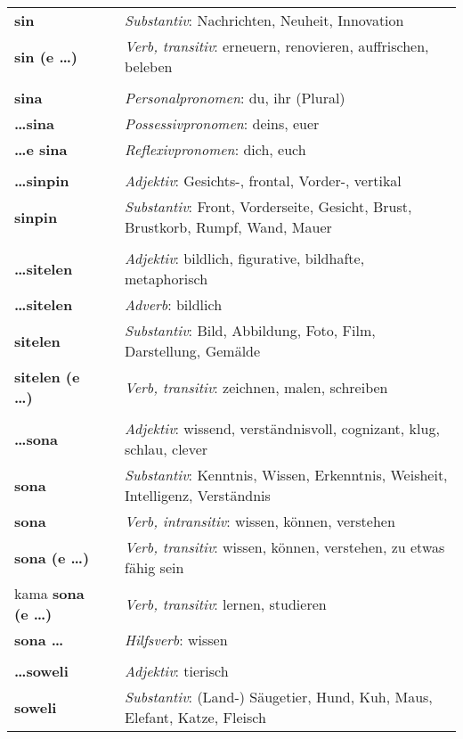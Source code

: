 \begin{supertabular}{p{2,5cm}|ll}
\textbf{sin} && \textit{Substantiv}: Nachrichten, Neuheit, Innovation \\ 
\textbf{sin (e \dots)} && \textit{Verb, transitiv}: erneuern, renovieren, auffrischen, beleben \\ 
 && \\ %
\textbf{sina} && \textit{Personalpronomen}: du, ihr (Plural)  \\ 
\textbf{\dots sina} && \textit{Possessivpronomen}: deins, euer  \\  
\textbf{\dots e sina} && \textit{Reflexivpronomen}: dich, euch  \\  
 && \\ %
\textbf{\dots sinpin} && \textit{Adjektiv}: Gesichts-, frontal, Vorder-, vertikal \\ 
\textbf{sinpin} && \textit{Substantiv}: Front, Vorderseite, Gesicht, Brust, Brustkorb, Rumpf, Wand, Mauer \\ 
 && \\ %
\textbf{\dots sitelen} && \textit{Adjektiv}: bildlich, figurative, bildhafte, metaphorisch \\ 
\textbf{\dots sitelen} && \textit{Adverb}: bildlich \\ 
\textbf{sitelen} && \textit{Substantiv}: Bild, Abbildung, Foto, Film, Darstellung, Gemälde \\ 
\textbf{sitelen (e \dots)} && \textit{Verb, transitiv}: zeichnen, malen, schreiben \\ 
 && \\ %
\textbf{\dots sona} && \textit{Adjektiv}: wissend, verständnisvoll, cognizant, klug, schlau, clever \\ 
\textbf{sona} && \textit{Substantiv}: Kenntnis, Wissen, Erkenntnis, Weisheit, Intelligenz, Verständnis \\ 
\textbf{sona} && \textit{Verb, intransitiv}: wissen, können, verstehen \\ 
\textbf{sona (e \dots)} && \textit{Verb, transitiv}: wissen, können, verstehen, zu etwas fähig sein \\ 
kama \textbf{sona (e \dots)} && \textit{Verb, transitiv}: lernen, studieren \\ 
\textbf{sona \dots} && \textit{Hilfsverb}: wissen \\ 
 && \\ %
\textbf{\dots soweli} && \textit{Adjektiv}: tierisch \\ 
\textbf{soweli} && \textit{Substantiv}: (Land-) Säugetier, Hund, Kuh, Maus, Elefant, Katze, Fleisch \\ 

\end{supertabular}
